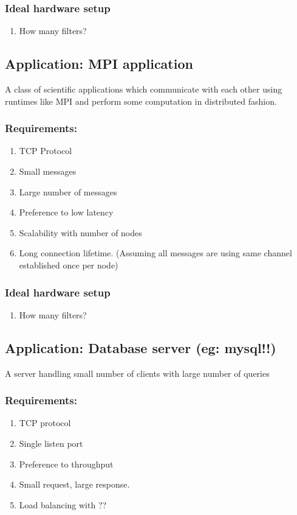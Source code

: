 \subsubsection{Ideal hardware setup}
\begin{enumerate}
    \item How many filters?
\end{enumerate}

\subsection{Application: MPI application}
A class of scientific applications which communicate with each other using
runtimes like MPI and perform some computation in distributed fashion.

\subsubsection{Requirements:}
\begin{enumerate}
    \item TCP Protocol
    \item Small messages
    \item Large number of messages
    \item Preference to low latency
    \item Scalability with number of nodes
    \item Long connection lifetime. (Assuming all messages are using same
            channel established once per node)
\end{enumerate}

\subsubsection{Ideal hardware setup}
\begin{enumerate}
    \item How many filters?
\end{enumerate}

\subsection{Application:  Database server (eg: mysql!!)}
A server handling small number of clients with large number of queries
\subsubsection{Requirements:}
\begin{enumerate}
    \item TCP protocol
    \item Single listen port
    \item Preference to throughput
    \item Small request, large response.
    \item Load balancing with ??
\end{enumerate}

